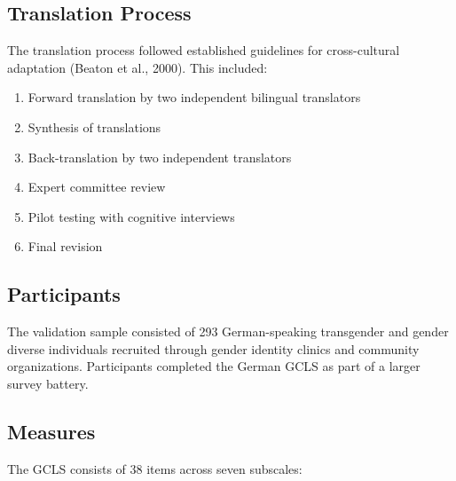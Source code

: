 \documentclass[man,floatsintext,12pt]{apa7}
\begin{document}
\subsection{Translation Process}\label{translation-process}

The translation process followed established guidelines for
cross-cultural adaptation (Beaton et al., 2000). This included:

\begin{enumerate}
\def\labelenumi{\arabic{enumi}.}
\tightlist
\item
  Forward translation by two independent bilingual translators
\item
  Synthesis of translations
\item
  Back-translation by two independent translators
\item
  Expert committee review
\item
  Pilot testing with cognitive interviews
\item
  Final revision
\end{enumerate}

\subsection{Participants}\label{participants}

The validation sample consisted of 293 German-speaking transgender and
gender diverse individuals recruited through gender identity clinics and
community organizations. Participants completed the German GCLS as part
of a larger survey battery.

\subsection{Measures}\label{measures}

The GCLS consists of 38 items across seven subscales:
\end{document}
